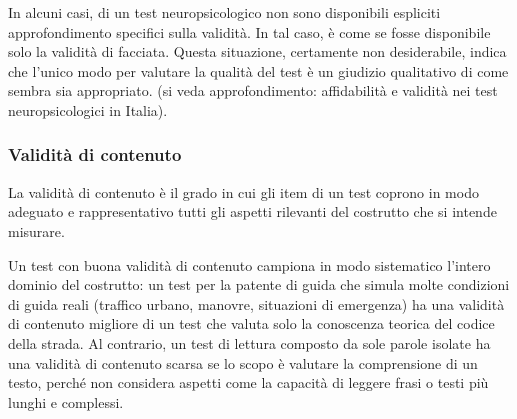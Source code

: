 \documentclass[
  italian,
  letterpaper,
  paper=6in:9in,
  pagesize=pdftex,
  headinclude=on,
  footinclude=on,
  11pt]{scrbook}
\begin{document}
\begin{tcolorbox}[enhanced jigsaw, title=\textcolor{quarto-callout-tip-color}{\faLightbulb}\hspace{0.5em}{Validità di facciata come unico tipo di validità.}, coltitle=black, bottomtitle=1mm, colback=white, bottomrule=.15mm, rightrule=.15mm, breakable, toptitle=1mm, left=2mm, colbacktitle=quarto-callout-tip-color!10!white, titlerule=0mm, colframe=quarto-callout-tip-color-frame, leftrule=.75mm, opacitybacktitle=0.6, arc=.35mm, toprule=.15mm, opacityback=0]

In alcuni casi, di un test neuropsicologico non sono disponibili
espliciti approfondimento specifici sulla validità. In tal caso, è come
se fosse disponibile solo la validità di facciata. Questa situazione,
certamente non desiderabile, indica che l'unico modo per valutare la
qualità del test è un giudizio qualitativo di come sembra sia
appropriato. (si veda approfondimento: affidabilità e validità nei test
neuropsicologici in Italia).

\end{tcolorbox}

\subsubsection{Validità di contenuto}\label{validituxe0-di-contenuto}

\begin{tcolorbox}[enhanced jigsaw, title=\textcolor{quarto-callout-note-color}{\faInfo}\hspace{0.5em}{Definizione}, coltitle=black, bottomtitle=1mm, colback=white, bottomrule=.15mm, rightrule=.15mm, breakable, toptitle=1mm, left=2mm, colbacktitle=quarto-callout-note-color!10!white, titlerule=0mm, colframe=quarto-callout-note-color-frame, leftrule=.75mm, opacitybacktitle=0.6, arc=.35mm, toprule=.15mm, opacityback=0]

La validità di contenuto è il grado in cui gli item di un test coprono
in modo adeguato e rappresentativo tutti gli aspetti rilevanti del
costrutto che si intende misurare.

\end{tcolorbox}

Un test con buona validità di contenuto campiona in modo sistematico
l'intero dominio del costrutto: un test per la patente di guida che
simula molte condizioni di guida reali (traffico urbano, manovre,
situazioni di emergenza) ha una validità di contenuto migliore di un
test che valuta solo la conoscenza teorica del codice della strada. Al
contrario, un test di lettura composto da sole parole isolate ha una
validità di contenuto scarsa se lo scopo è valutare la comprensione di
un testo, perché non considera aspetti come la capacità di leggere frasi
o testi più lunghi e complessi.
\end{document}
